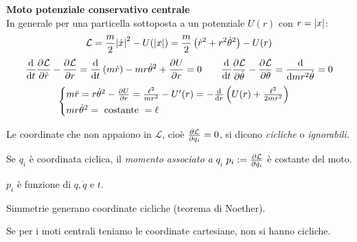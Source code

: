 \begin{example}
    \textbf{Moto potenziale conservativo centrale}\\
    In generale per una particella sottoposta a un potenziale $U(r )$ con $r = \abs{x}$:
    \begin{equation}
        \mathcal{L}= \frac{m}{2}\abs{\dot{x}}^2 -U(\abs{x}) = \frac{m}{2}\left( \dot{r}^2+r^2\dot{\theta}^2 \right)-U(r)
    \end{equation}
    \begin{equation}
        \dv{t}\pdv{\mathcal{L}}{\dot{r}}-\pdv{\mathcal{L}}{r}= \dv{t}\left( m\dot{r} \right) - mr\dot{\theta}^2 + \pdv{U}{r}=0\qquad 
        \dv{t}\pdv{\mathcal{L}}{\dot{\theta}}-\pdv{\mathcal{L}}{\theta}= \dv{mr^2\dot{\theta}}=0
    \end{equation}
    \begin{equation}
        \begin{cases}
            m\ddot{r}= r\dot{\theta}^2-\pdv{U}{r}= \frac{\ell^2}{mr^3}-U'(r)= -\dv{r}\left( U(r) + \frac{\ell^2}{2mr^2} \right)\\
            mr\dot{\theta}^2= \text{ costante }= \ell
        \end{cases}
    \end{equation}
\end{example}

\begin{definition}
    Le coordinate che non appaiono in $\mathcal{L}$, cioè $\pdv{\mathcal{L}}{q_i}=0$, si dicono \textit{cicliche} o \textit{ignorabili}.
\end{definition}
\begin{proposition}
    Se $q_i $ è coordinata ciclica, il \textit{momento associato a }$q_i $ $p_i:=\pdv{\mathcal{L}}{\dot{q}_i}$ è costante del moto.
\end{proposition}
\begin{remark}
    $p_i$ è funzione di $q,\dot{q}$ e $t$.
\end{remark}
\begin{remark}
    Simmetrie generano coordinate cicliche (teorema di Noether).
\end{remark}

\begin{example}
    Se per i moti centrali teniamo le coordinate cartesiane, non si hanno cicliche.
\end{example}

